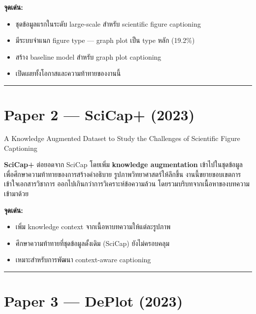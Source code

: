 \documentclass[11pt,a4paper]{article}
\begin{document}
\vspace{6pt}
\noindent\textbf{จุดเด่น:}
\begin{itemize}[nosep, leftmargin=2em]
  \item ชุดข้อมูลแรกในระดับ large-scale สำหรับ scientific figure captioning
  \item มีระบบจำแนก figure type — graph plot เป็น type หลัก (19.2\%)
  \item สร้าง baseline model สำหรับ graph plot captioning
  \item เปิดเผยทั้งโอกาสและความท้าทายของงานนี้
\end{itemize}

\vspace{12pt}
\noindent\rule{\textwidth}{0.4pt}

\section*{Paper 2 — SciCap+ (2023)}

 A Knowledge Augmented Dataset to Study the Challenges of Scientific Figure Captioning\\

\vspace{8pt}
\setlength{\parindent}{2em}
\textbf{SciCap+} ต่อยอดจาก SciCap โดยเพิ่ม \textbf{knowledge augmentation}
เข้าไปในชุดข้อมูล เพื่อศึกษาความท้าทายของการสร้างคำอธิบาย
รูปภาพวิทยาศาสตร์ให้ลึกขึ้น งานนี้ขยายขอบเขตการเข้าใจเอกสารวิชาการ
ออกไปเกินกว่าการวิเคราะห์ข้อความล้วน โดยรวมบริบทจากเนื้อหาของบทความเข้ามาด้วย

\vspace{6pt}
\noindent\textbf{จุดเด่น:}
\begin{itemize}[nosep, leftmargin=2em]
  \item เพิ่ม knowledge context จากเนื้อหาบทความให้แต่ละรูปภาพ
  \item ศึกษาความท้าทายที่ชุดข้อมูลดั้งเดิม (SciCap) ยังไม่ครอบคลุม
  \item เหมาะสำหรับการพัฒนา context-aware captioning
\end{itemize}

\vspace{12pt}
\noindent\rule{\textwidth}{0.4pt}

\section*{Paper 3 — DePlot (2023)}
\end{document}
